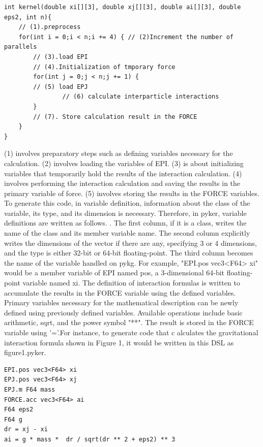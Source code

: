 \documentclass[ams, a4j]{U-AizuGT}
\begin{document}
\begin{lstlisting}[frame=single, caption=skeleton code, label=fuga]
int kernel(double xi[][3], double xj[][3], double ai[][3], double eps2, int n){
	// (1).preprocess
	for(int i = 0;i < n;i += 4) { // (2)Increment the number of parallels
		// (3).load EPI
		// (4).Initialization of tmporary force
		for(int j = 0;j < n;j += 1) {
        // (5) load EPJ
				// (6) calculate interparticle interactions
		}
		// (7). Store calculation result in the FORCE
	}
}
\end{lstlisting}

(1) involves preparatory steps such as defining variables necessary for the calculation. (2) 
involves loading the variables of EPI. (3) is about initializing variables that temporarily
 hold the results of the interaction calculation. (4) involves performing the interaction 
 calculation and saving the results in the primary variable of force. (5) involves storing the results in the FORCE variables.
To generate this code, in variable definition, information about the class of the variable,
 its type, and its dimension is necessary. Therefore, in pyker, variable definitions are written as follows. .
The first column, if it is a class, writes the name of the class and its member variable
 name. The second column explicitly writes the dimensions of the vector if there are any, 
 specifying 3 or 4 dimensions, and the type is either 32-bit or 64-bit floating-point. The 
 third column becomes the name of the variable handled on pykg. For example, "EPI.pos vec3<F64> xi" 
 would be a member variable of EPI named pos, a 3-dimensional 64-bit floating-point variable named xi.
The definition of interaction formulas is written to accumulate the results in the FORCE variable using
 the defined variables. Primary variables necessary for the mathematical description can be newly defined 
 using previously defined variables. Available operations include basic arithmetic, sqrt, and the power 
 symbol "**". The result is stored in the FORCE variable using '='.For instance, to generate code that c
 alculates the gravitational interaction formula shown in Figure 1, it would be written in this DSL as figure1.pyker.


\begin{lstlisting}[frame=single, caption=hoge, label=fuga]
EPI.pos vec3<F64> xi
EPJ.pos vec3<F64> xj
EPJ.m F64 mass
FORCE.acc vec3<F64> ai
F64 eps2
F64 g
dr = xj - xi
ai = g * mass *  dr / sqrt(dr ** 2 + eps2) ** 3
\end{lstlisting}
\end{document}
